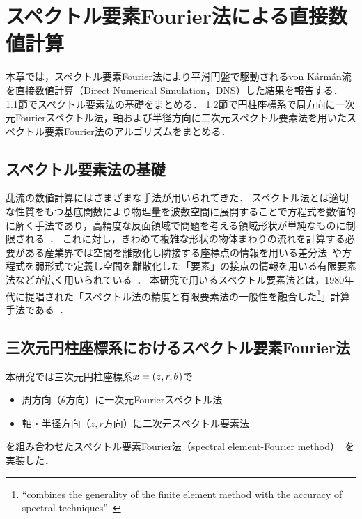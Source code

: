 \chapter{スペクトル要素Fourier法による直接数値計算}
\label{chap:NumericalCalculation}

本章では，スペクトル要素Fourier法により平滑円盤で駆動されるvon K\'arm\'an流を直接数値計算（Direct Numerical Simulation，DNS）した結果を報告する．
\ref{sec:BasisOfSpectralElementMethod}節でスペクトル要素法の基礎をまとめる．
\ref{sec:SpectralElementFourierMethod}節で円柱座標系で周方向に一次元Fourierスペクトル法，軸および半径方向に二次元スペクトル要素法を用いたスペクトル要素Fourier法のアルゴリズムをまとめる．


\section{スペクトル要素法の基礎}
\label{sec:BasisOfSpectralElementMethod}

乱流の数値計算にはさまざまな手法が用いられてきた．
スペクトル法とは適切な性質をもつ基底関数により物理量を波数空間に展開することで方程式を数値的に解く手法であり，高精度な反面領域で問題を考える領域形状が単純なものに制限される~\cite{Ishioka_spectral}．
これに対し，きわめて複雑な形状の物体まわりの流れを計算する必要がある産業界では空間を離散化し隣接する座標点の情報を用いる差分法~\cite{Kajishima_turbulence_simulation}や方程式を弱形式で定義し空間を離散化した「要素」の接点の情報を用いる有限要素法などが広く用いられている~\cite{1994fem_mathematics}．
本研究で用いるスペクトル要素法とは，1980年代に提唱された「スペクトル法の精度と有限要素法の一般性を融合した\footnote{``combines the generality of the finite element method with the accuracy of spectral techniques''~\cite{Patera1984}}」計算手法である~\cite{karniadakis2005spectral}．


\section{三次元円柱座標系におけるスペクトル要素Fourier法}
\label{sec:SpectralElementFourierMethod}

本研究では三次元円柱座標系$\vb*{x} = (z,r,\theta)$で
\begin{itemize}
  \item 周方向（$\theta$方向）に一次元Fourierスペクトル法
  \item 軸・半径方向（$z,r$方向）に二次元スペクトル要素法
\end{itemize}
を組み合わせたスペクトル要素Fourier法（spectral element-Fourier method）~\cite{Karniadakis1991,Blackburn2004}を実装した．

